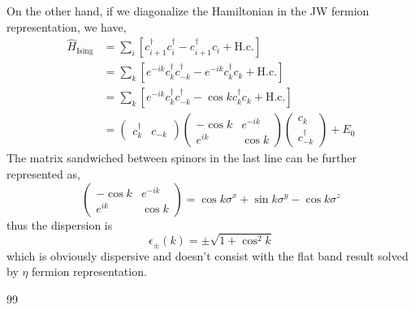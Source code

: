\documentclass[12font]{article}
\newcommand{\lr}[1]{\left(  #1  \right)}
\newcommand{\lrm}[1]{\left[  #1  \right]}
\newcommand{\mrm}[1]{\mathrm{#1}}
\begin{document}
On the other hand, if we diagonalize the Hamiltonian in the JW fermion representation, we have,
\begin{align*}
  \hat{H}_{\mrm{Ising}} &= \sum_{i}\lrm{c_{i+1}^\dagger c_i^\dagger - c_{i+1}^\dagger c_i + \mrm{H.c.}} \\
  &= \sum_{k}\lrm{e^{-ik}c_{k}^\dagger c_{-k}^\dagger - e^{-ik} c_k^\dagger c_k + \mrm{H.c.}} \\
  &= \sum_{k}\lrm{e^{-ik}c_{k}^\dagger c_{-k}^\dagger - \cos k c_k^\dagger c_k + \mrm{H.c.}} \\
  &= \begin{pmatrix}
       c_k^\dagger & c_{-k} 
     \end{pmatrix}\begin{pmatrix}
                    -\cos k & e^{-ik} \\
                    e^{ik} & \cos k 
                  \end{pmatrix}\begin{pmatrix}
                                 c_k \\
                                 c_{-k}^\dagger 
                               \end{pmatrix} + E_0
\end{align*}
The matrix sandwiched between spinors in the last line can be further represented as,
\[
\begin{pmatrix}
-\cos k & e^{-ik} \\
e^{ik} & \cos k 
\end{pmatrix} = \cos k\sigma^x + \sin k \sigma^y - \cos k \sigma^z
\]
thus the dispersion is
\begin{equation}\label{real band structure.e}
  \epsilon_{\pm}\lr{k} = \pm\sqrt{1 + \cos^2 k}
\end{equation}
which is obviously dispersive and doesn't consist with the flat band result solved by $\eta$ fermion representation.


\begin{thebibliography}{99}

    \bibitem{}{}

\end{thebibliography}
\end{document}
